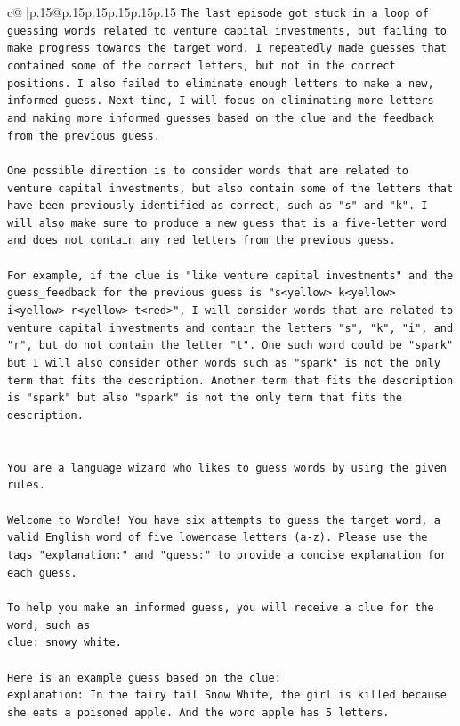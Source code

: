 \documentclass{article}
\begin{document}
{\begin{supertabular}{c@{$\;$}|p{.15\linewidth}@{}p{.15\linewidth}p{.15\linewidth}p{.15\linewidth}p{.15\linewidth}p{.15\linewidth}}
{{{\texttt{The last episode got stuck in a loop of guessing words related to venture capital investments, but failing to make progress towards the target word. I repeatedly made guesses that contained some of the correct letters, but not in the correct positions. I also failed to eliminate enough letters to make a new, informed guess. Next time, I will focus on eliminating more letters and making more informed guesses based on the clue and the feedback from the previous guess. } \\
\\ 
\texttt{One possible direction is to consider words that are related to venture capital investments, but also contain some of the letters that have been previously identified as correct, such as "s" and "k". I will also make sure to produce a new guess that is a five{-}letter word and does not contain any red letters from the previous guess. } \\
\\ 
\texttt{For example, if the clue is "like venture capital investments" and the guess\_feedback for the previous guess is "s<yellow> k<yellow> i<yellow> r<yellow> t<red>", I will consider words that are related to venture capital investments and contain the letters "s", "k", "i", and "r", but do not contain the letter "t". One such word could be "spark" but I will also consider other words such as "spark" is not the only term that fits the description. Another term that fits the description is "spark" but also "spark" is not the only term that fits the description.} \\
\\ 
\\ 
\texttt{You are a language wizard who likes to guess words by using the given rules.} \\
\\ 
\texttt{Welcome to Wordle! You have six attempts to guess the target word, a valid English word of five lowercase letters (a{-}z). Please use the tags "explanation:" and "guess:" to provide a concise explanation for each guess.} \\
\\ 
\texttt{To help you make an informed guess, you will receive a clue for the word, such as} \\
\texttt{clue: snowy white.} \\
\\ 
\texttt{Here is an example guess based on the clue:} \\
\texttt{explanation: In the fairy tail Snow White, the girl is killed because she eats a poisoned apple. And the word apple has 5 letters.} \\
}}}
\end{supertabular}}
\end{document}
